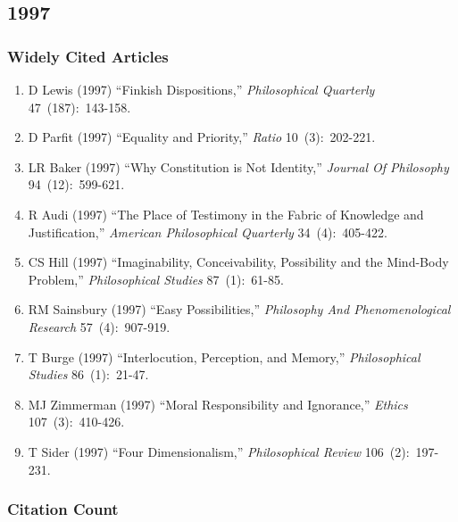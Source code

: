 \documentclass[
  10pt,
  letterpaper,
  DIV=11,
  numbers=noendperiod,
  twoside]{scrartcl}
\providecommand{\tightlist}{%
  \setlength{\itemsep}{0pt}\setlength{\parskip}{0pt}}\usepackage{longtable,booktabs,array}
\begin{document}
\newpage

\subsection{1997}\label{sec-s1997}

\subsubsection*{Widely Cited Articles}\label{widely-cited-articles-40}

\begin{enumerate}
\def\labelenumi{\arabic{enumi}.}
\tightlist
\item
  D Lewis (1997) ``Finkish Dispositions,'' \emph{Philosophical
  Quarterly} 47~(187):~143-158.
\item
  D Parfit (1997) ``Equality and Priority,'' \emph{Ratio}
  10~(3):~202-221.
\item
  LR Baker (1997) ``Why Constitution is Not Identity,'' \emph{Journal Of
  Philosophy} 94~(12):~599-621.
\item
  R Audi (1997) ``The Place of Testimony in the Fabric of Knowledge and
  Justification,'' \emph{American Philosophical Quarterly}
  34~(4):~405-422.
\item
  CS Hill (1997) ``Imaginability, Conceivability, Possibility and the
  Mind-Body Problem,'' \emph{Philosophical Studies} 87~(1):~61-85.
\item
  RM Sainsbury (1997) ``Easy Possibilities,'' \emph{Philosophy And
  Phenomenological Research} 57~(4):~907-919.
\item
  T Burge (1997) ``Interlocution, Perception, and Memory,''
  \emph{Philosophical Studies} 86~(1):~21-47.
\item
  MJ Zimmerman (1997) ``Moral Responsibility and Ignorance,''
  \emph{Ethics} 107~(3):~410-426.
\item
  T Sider (1997) ``Four Dimensionalism,'' \emph{Philosophical Review}
  106~(2):~197-231.
\end{enumerate}

\subsubsection*{Citation Count}\label{sec-count-1997}
\end{document}
